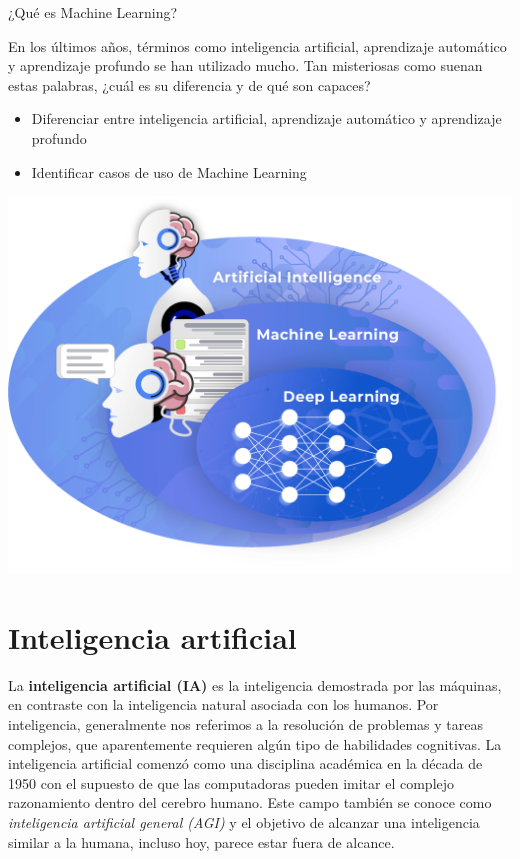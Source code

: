 \documentclass[
]{book}
\providecommand{\tightlist}{%
  \setlength{\itemsep}{0pt}\setlength{\parskip}{0pt}}
\begin{document}
¿Qué es Machine Learning?

En los últimos años, términos como inteligencia artificial, aprendizaje automático y aprendizaje profundo se han utilizado mucho. Tan misteriosas como suenan estas palabras, ¿cuál es su diferencia y de qué son capaces?

\begin{itemize}
\tightlist
\item
  Diferenciar entre inteligencia artificial, aprendizaje automático y aprendizaje profundo
\item
  Identificar casos de uso de Machine Learning
\end{itemize}

\includegraphics{img/int.png}

\hypertarget{inteligencia-artificial}{%
\section{Inteligencia artificial}\label{inteligencia-artificial}}

La \textbf{inteligencia artificial (IA)} es la inteligencia demostrada por las máquinas, en contraste con la inteligencia natural asociada con los humanos. Por inteligencia, generalmente nos referimos a la resolución de problemas y tareas complejos, que aparentemente requieren algún tipo de habilidades cognitivas. La inteligencia artificial comenzó como una disciplina académica en la década de 1950 con el supuesto de que las computadoras pueden imitar el complejo razonamiento dentro del cerebro humano. Este campo también se conoce como \emph{inteligencia artificial general (AGI)} y el objetivo de alcanzar una inteligencia similar a la humana, incluso hoy, parece estar fuera de alcance.
\end{document}
